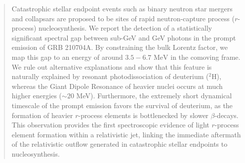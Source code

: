 \documentclass[prd,twocolumn,amsmath,amssymb,aps,linenumbers]{revtex4-2} %
\begin{document}
\begin{abstract}
Catastrophic stellar endpoint events such as binary neutron star mergers and collapsars are proposed to be sites of rapid neutron-capture process ($r$-process) nucleosynthesis. We report the detection of a statistically significant spectral gap between sub-GeV and GeV photons in the prompt emission of GRB 210704A. By constraining the bulk Lorentz factor, we map this gap to an energy of around $3.5 - 6.7 \text{ MeV}$ in the comoving frame. We rule out alternative explanations and show that this feature is naturally explained by resonant photodissociation of deuterium ($^2$H), whereas the Giant Dipole Resonance of heavier nuclei occurs at much higher energies ($\sim 20$ MeV). Furthermore, the extremely short dynamical timescale of the prompt emission favors the survival of deuterium, as the formation of heavier $r$-process elements is bottlenecked by slower $\beta$-decays. This observation provides the first spectroscopic evidence of light $r$-process element formation within a relativistic jet, linking the immediate aftermath of the relativistic outflow generated in catastrophic stellar endpoints to nucleosynthesis.
\end{abstract}

\maketitle
\end{document}
